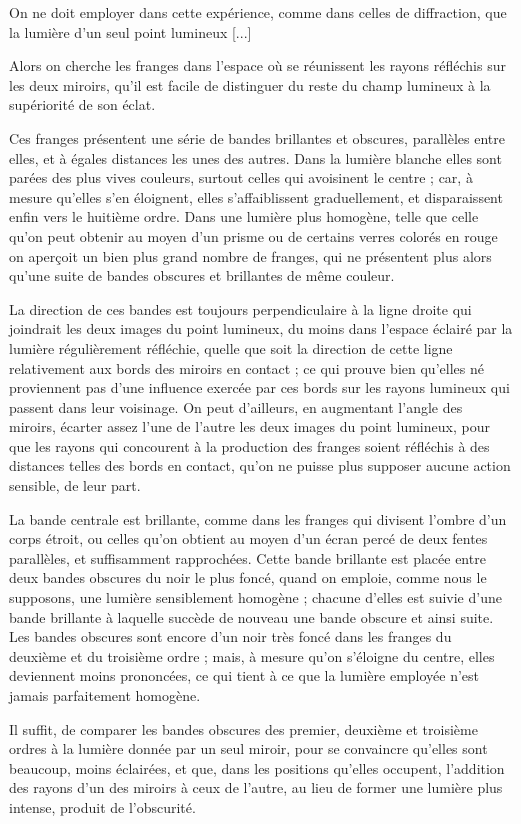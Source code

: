 \documentclass[11pt,fleqn]{book} %
\begin{document}
\begin{encart}
\begin{displayquote}
{On ne doit employer dans cette expérience, comme dans celles de diffraction, que la lumière d'un seul point lumineux [...]

Alors on cherche les franges dans l'espace où se réunissent les rayons réfléchis sur les deux miroirs, qu'il est facile de distinguer du reste du champ lumineux à la supériorité de son éclat.

Ces franges présentent une série de bandes brillantes et obscures, parallèles entre elles, et à égales distances les unes des autres. Dans la lumière blanche elles sont parées des plus vives couleurs, surtout celles qui avoisinent le centre ; car, à mesure qu'elles s'en éloignent, elles s'affaiblissent graduellement, et disparaissent enfin vers le huitième ordre. Dans une lumière plus homogène, telle que celle qu'on peut obtenir au moyen d'un prisme ou de certains verres colorés en rouge on aperçoit un bien plus grand nombre de franges, qui ne présentent plus alors qu'une suite de bandes obscures et brillantes de même couleur.

La direction de ces bandes est toujours perpendiculaire à la ligne droite qui joindrait les deux images du point lumineux, du moins dans l'espace éclairé par la lumière régulièrement réfléchie, quelle que soit la direction de cette ligne relativement aux bords des miroirs en contact ; ce qui prouve bien qu'elles né proviennent pas d'une influence exercée par ces bords sur les rayons lumineux qui passent dans leur voisinage. On peut d'ailleurs, en augmentant l'angle des miroirs, écarter assez l'une de l'autre les deux images du point lumineux, pour que les rayons qui concourent à la production des franges soient réfléchis à des distances telles des bords en contact, qu'on ne puisse plus supposer aucune action sensible, de leur part.

La bande centrale est brillante, comme dans les franges qui divisent l'ombre d'un corps étroit, ou celles qu'on obtient au moyen d'un écran percé de deux fentes parallèles, et suffisamment rapprochées. Cette bande brillante est placée entre deux bandes obscures du noir le plus foncé, quand on emploie, comme nous le supposons, une lumière sensiblement homogène ; chacune d'elles est suivie d'une bande brillante à laquelle succède de nouveau une bande obscure et ainsi suite. Les bandes obscures sont encore d'un noir très foncé dans les franges du deuxième et du troisième ordre ; mais, à mesure qu'on s'éloigne du centre, elles deviennent moins prononcées, ce qui tient à ce que la lumière employée n'est jamais parfaitement homogène.

Il suffit, de comparer les bandes obscures des premier, deuxième et troisième ordres à la lumière donnée par un seul miroir, pour se convaincre qu'elles sont beaucoup, moins éclairées, et que, dans les positions qu'elles occupent, l'addition des rayons d'un des miroirs à ceux de l'autre, au lieu de former une lumière plus intense, produit de l'obscurité.}
	\end{displayquote}
\end{encart}
\end{document}

